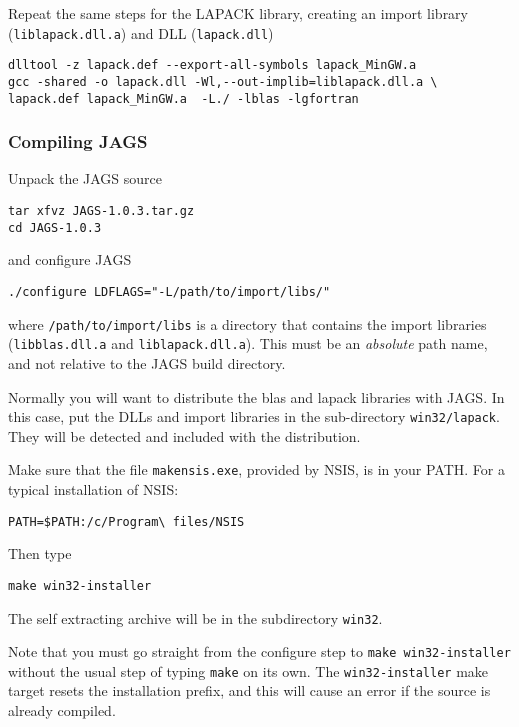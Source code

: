 \documentclass[11pt, a4paper, titlepage]{report}
\newcommand{\JAGS}{\textsf{JAGS}}
\begin{document}
Repeat the same steps for the LAPACK library, creating an import library
(\verb+liblapack.dll.a+) and DLL (\verb+lapack.dll+)
\begin{verbatim}
dlltool -z lapack.def --export-all-symbols lapack_MinGW.a
gcc -shared -o lapack.dll -Wl,--out-implib=liblapack.dll.a \
lapack.def lapack_MinGW.a  -L./ -lblas -lgfortran
\end{verbatim}

\subsubsection{Compiling \JAGS}

Unpack the JAGS source
\begin{verbatim}
tar xfvz JAGS-1.0.3.tar.gz
cd JAGS-1.0.3
\end{verbatim}
and configure JAGS
\begin{verbatim}
./configure LDFLAGS="-L/path/to/import/libs/" 
\end{verbatim}
where \verb+/path/to/import/libs+ is a directory that contains the
import libraries (\verb+libblas.dll.a+ and \verb+liblapack.dll.a+).
This must be an {\em absolute} path name, and not relative to
the JAGS build directory.

Normally you will want to distribute the blas and lapack libraries
with JAGS.  In this case, put the DLLs and import libraries in the
sub-directory \verb+win32/lapack+. They will be detected and included
with the distribution.

Make sure that the file \verb+makensis.exe+, provided by NSIS, is in
your PATH. For a typical installation of NSIS:
\begin{verbatim}
PATH=$PATH:/c/Program\ files/NSIS
\end{verbatim}
Then type
\begin{verbatim}
make win32-installer
\end{verbatim}
The self extracting archive will be in the subdirectory \verb+win32+.

Note that you must go straight from the configure step to \texttt{make
  win32-installer} without the usual step of typing \texttt{make} on
its own.  The \texttt{win32-installer} make target resets the
installation prefix, and this will cause an error if the source is
already compiled.
\end{document}

